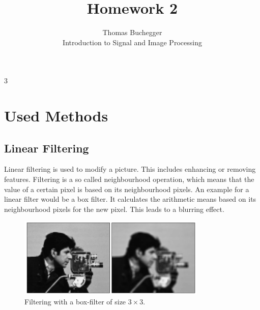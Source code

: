 \documentclass[12pt]{article}
\begin{document}


\title{Homework 2}%
\author{Thomas Buchegger\\ %
Introduction to Signal and Image Processing}
\maketitle

\setcounter{tocdepth}3 %
\tableofcontents

\pagebreak
\section{Used Methods}
\subsection{Linear Filtering}
Linear filtering is used to modify a picture. This includes enhancing or removing features. Filtering is a so called neighbourhood operation, which means
that the value of a certain pixel is based on its neighbourhood pixels.
\newline
An example for a linear filter would be a box filter. It calculates the arithmetic means
based on its neighbourhood pixels for the new pixel. This leads to a blurring effect. 

\begin{figure}[!htb]
    \centering
    \includegraphics[width=0.8\textwidth]{pics/boxFilterExample}
    \caption{Filtering with a box-filter of size $3 \times 3$.}
    \label{fig:boxfilter}
    \end{figure}
\end{document}
